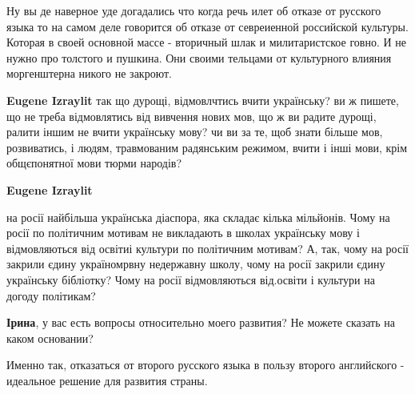 \begin{itemize}
\begin{itemize}
Ну вы де наверное уде догадались что когда речь илет об отказе от русского
языка то на самом деле говорится об отказе от севреиенной российской культуры.
Которая в своей основной массе - вторичный шлак и милитаристское говно. И не
нужно про толстого и пушкина. Они своими тельцами от культурного влияния
моргенштерна никого не закроют.


 
\textbf{Eugene Izraylit} так що дурощі, відмовлчтись вчити українську? ви ж
пишете, що не треба відмовлятись від вивчення нових мов, що ж ви радите дурощі,
ралити іншим не вчити українську мову? чи ви за те, щоб знати більше мов,
розвиватись, і людям, травмованим радянським режимом, вчити і інші мови, крім
общєпонятної мови тюрми народів?

 
\textbf{Eugene Izraylit} 

на росії найбільша українська діаспора, яка складає кілька мільйонів. Чому на
росії по політичним мотивам не викладають в школах українську мову і
відмовляються від освітиі культури по політичним мотивам? А, так, чому на росії
закрили єдину україномрвну недержавну школу, чому на росії закрили єдину
українську бібліотку? Чому на росії відмовляються від.освіти і культури на
догоду політикам?


 
\textbf{Ірина}, у вас есть вопросы относительно моего развития? Не можете сказать на каком основании?

 

Именно так, отказаться от второго русского языка в пользу второго английского -
идеальное решение для развития страны.


\end{itemize}
\end{itemize}
